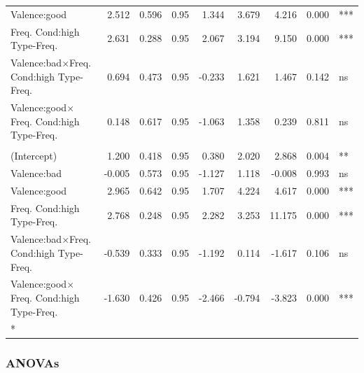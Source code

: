 \documentclass[
]{article}
\begin{document}
\begin{longtable}[t]{lrrrrrrrl}
\hspace{1em}Valence:good & 2.512 & 0.596 & 0.95 & 1.344 & 3.679 & 4.216 & 0.000 & ***\\
Freq.
Cond:high
\hspace{1em}Type-Freq. & 2.631 & 0.288 & 0.95 & 2.067 & 3.194 & 9.150 & 0.000 & ***\\
Valence:bad$\times$Freq.
Cond:high
\hspace{1em}Type-Freq. & 0.694 & 0.473 & 0.95 & -0.233 & 1.621 & 1.467 & 0.142 & ns\\
Valence:good$\times$Freq.
Cond:high
\hspace{1em}Type-Freq. & 0.148 & 0.617 & 0.95 & -1.063 & 1.358 & 0.239 & 0.811 & ns\\
\addlinespace[0.3em]
\multicolumn{9}{l}{\textbf{Prevalence - Testable}}\\
\hspace{1em}(Intercept) & 1.200 & 0.418 & 0.95 & 0.380 & 2.020 & 2.868 & 0.004 & **\\
\hspace{1em}Valence:bad & -0.005 & 0.573 & 0.95 & -1.127 & 1.118 & -0.008 & 0.993 & ns\\
\hspace{1em}Valence:good & 2.965 & 0.642 & 0.95 & 1.707 & 4.224 & 4.617 & 0.000 & ***\\
Freq.
Cond:high
\hspace{1em}Type-Freq. & 2.768 & 0.248 & 0.95 & 2.282 & 3.253 & 11.175 & 0.000 & ***\\
Valence:bad$\times$Freq.
Cond:high
\hspace{1em}Type-Freq. & -0.539 & 0.333 & 0.95 & -1.192 & 0.114 & -1.617 & 0.106 & ns\\
Valence:good$\times$Freq.
Cond:high
\hspace{1em}Type-Freq. & -1.630 & 0.426 & 0.95 & -2.466 & -0.794 & -3.823 & 0.000 & ***\\*
\end{longtable}

\subsubsection{ANOVAs}\label{anovas-1}
\end{document}
